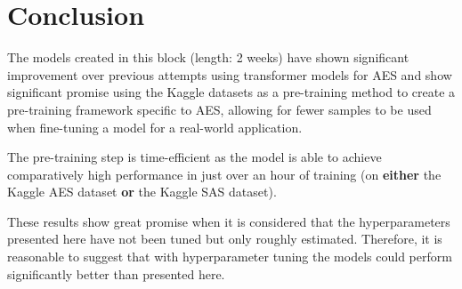 \documentclass[11pt]{article}
\begin{document}
\newpage

\section{Conclusion}
\label{sec:orgc0d026d}
The models created in this block (length: 2 weeks) have shown significant improvement over previous attempts using transformer models for AES and show significant promise using the Kaggle datasets as a pre-training method to create a pre-training framework specific to AES, allowing for fewer samples to be used when fine-tuning a model for a real-world application.

The pre-training step is time-efficient as the model is able to achieve comparatively high performance in just over an hour of training (on \textbf{\textbf{either}} the Kaggle AES dataset \textbf{\textbf{or}} the Kaggle SAS dataset).

These results show great promise when it is considered that the hyperparameters presented here have not been tuned but only roughly estimated. Therefore, it is reasonable to suggest that with hyperparameter tuning the models could perform significantly better than presented here.



\end{document}
